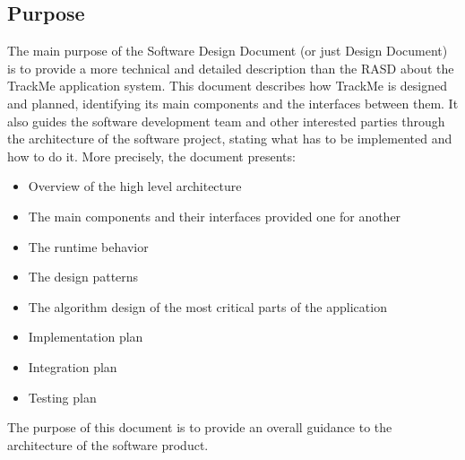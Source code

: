 \documentclass[12pt]{article}
\begin{document}
\subsection{Purpose}
The main purpose of the Software Design Document (or just Design Document) is to provide a more technical and detailed description than the RASD about the TrackMe application system. This document describes how TrackMe is designed and planned, identifying its main components and the interfaces between them. It also guides the software development team and other interested parties through the architecture of the software project, stating what has to be implemented and how to do it.
\vspace{3mm}
\newline 
More precisely, the document presents:
\begin{itemize}
    \item Overview of the high level architecture
    \item The main components and their interfaces provided one for another
    \item The runtime behavior
    \item The design patterns
    \item The algorithm design of the most critical parts of the application
    \item Implementation plan
    \item Integration plan
    \item Testing plan
\end{itemize}
The purpose of this document is to provide an overall guidance to the architecture of the software product.
\end{document}
